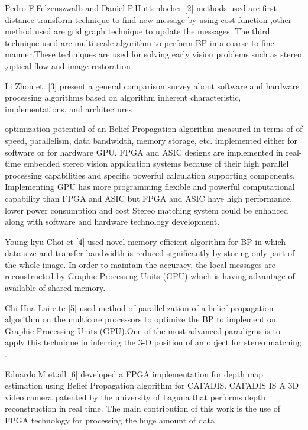 Pedro F.Felzenszwalb and Daniel P.Huttenlocher [2] methods used are first distance transform technique to find new message by using cost function ,other method used are grid graph technique to update the messages.
The third technique used are multi scale algorithm to perform BP in a coarse to fine manner.These techniques are used for solving early vision problems such as stereo ,optical flow and image restoration

Li Zhou et. [3] present a general comparison survey about software and hardware processing algorithms based on algorithm inherent characteristic, implementations, and architectures

optimization potential of an Belief Propagation algorithm measured  in terms of
of speed, parallelism, data bandwidth, memory storage, etc. implemented either for  software or  for hardware
 GPU, FPGA and ASIC designs are  implemented in real-time embedded stereo vision application systems because of their high parallel processing capabilities and specific powerful calculation supporting components.
Implementing GPU has more programming flexible and powerful computational capability than FPGA and ASIC but FPGA and ASIC  have high performance, lower power consumption and cost
Stereo matching system could be enhanced along with software and hardware technology development.


Young-kyu Choi et [4] used novel memory efficient algorithm for BP in which data size and transfer bandwidth is reduced significantly by storing only part of the whole image.
In order to maintain the accuracy, the local messages are reconstructed by Graphic Processing Units (GPU) which is having advantage of available of shared memory.



Chi-Hua Lai e.tc [5] used  method of  parallelization of a belief propagation algorithm on the multicore processors  to optimize the BP  to implement on Graphic Processing Units (GPU).One of the most advanced paradigms is to apply this  technique in inferring the 3-D position of an object for stereo matching .


 Eduardo.M et.all [6] developed a FPGA implementation for depth map estimation using Belief Propagation algorithm for CAFADIS. CAFADIS IS A 3D video camera  patented  by the university of Laguna that performs depth reconstruction in real time.
The main contribution of this work is the use of FPGA technology for processing the huge amount of data



